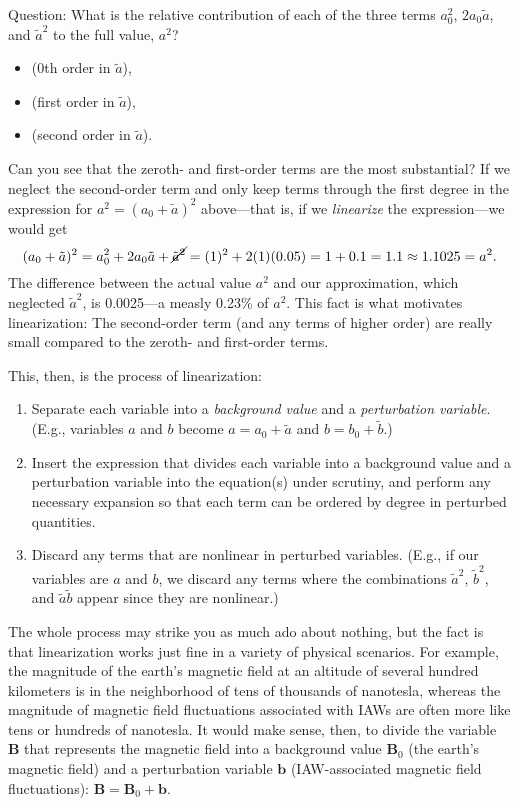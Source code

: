 Question: What is the relative contribution of each of the three terms $a_0^2$,
$2 a_0 \tilde a$, and $\tilde a^2$ to the full value, $a^2$?
\begin{itemize}
\item {} (0th order in $\tilde a$),
\item {} (first order in $\tilde a$),
\item {} (second order in $\tilde a$).
\end{itemize}

Can you see that the zeroth- and first-order terms are the most substantial? If
we neglect the second-order term and only keep terms through the first degree in
the expression for $a^2 = (a_0 + \tilde a)^2$ above---that is, if we
\emph{linearize} the expression---we would get
\begin{equation*}
  (a_0 + \tilde a)^2 = a_0^2 + 2 a_0 \tilde a + \cancel{{\tilde a}^2} = (1)^2 + 2(1)(0.05) = 1 + 0.1 = 1.1 \approx 1.1025 = a^2.
\end{equation*}
The difference between the actual value $a^2$ and our approximation, which
neglected $\tilde a^2$, is 0.0025---a measly 0.23\% of $a^2$. This fact is what
motivates linearization: The second-order term (and any terms of higher order)
are really small compared to the zeroth- and first-order terms.

This, then, is the process of linearization: 
\begin{enumerate}
\item Separate each variable into a \emph{background value} and a
  \emph{perturbation variable}. (E.g., variables $a$ and $b$ become
  $a = a_0 + \tilde a$ and $b = b_0 + \tilde b$.)
\item Insert the expression that divides each variable into a background value
  and a perturbation variable into the equation(s) under scrutiny, and perform
  any necessary expansion so that each term can be ordered by degree in
  perturbed quantities.
\item Discard any terms that are nonlinear in perturbed variables. (E.g., if our
  variables are $a$ and $b$, we discard any terms where the combinations
  $\tilde a^2$, $\tilde b^2$, and $\tilde a \tilde b$ appear since they are nonlinear.)
\end{enumerate}

The whole process may strike you as much ado about nothing, but the fact is that
linearization works just fine in a variety of physical scenarios. For example,
the magnitude of the earth's magnetic field at an altitude of several hundred
kilometers is in the neighborhood of tens of thousands of nanotesla, whereas the
magnitude of magnetic field fluctuations associated with IAWs are often more
like tens or hundreds of nanotesla. It would make sense, then, to divide the
variable $\mathbf{B}$ that represents the magnetic field into a background value
$\mathbf{B}_0$ (the earth's magnetic field) and a perturbation variable
$\mathbf{b}$ (IAW-associated magnetic field fluctuations):
$\mathbf{B} = \mathbf{B}_0 + \mathbf{b}$.

